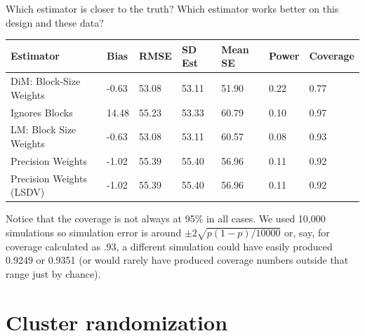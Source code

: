 \documentclass[
  ignorenonframetext,
]{beamer}
\begin{document}
\begin{frame}{Which estimator is closer to the truth?}
\protect\hypertarget{which-estimator-is-closer-to-the-truth-1}{}
Which estimator works better on this design and these data?

\scriptsize
\begin{tabular}{l|l|l|l|l|l|l}
\hline
Estimator & Bias & RMSE & SD Est & Mean SE & Power & Coverage\\
\hline
DiM: Block-Size Weights & -0.63 & 53.08 & 53.11 & 51.90 & 0.22 & 0.77\\
\hline
Ignores Blocks & 14.48 & 55.23 & 53.33 & 60.79 & 0.10 & 0.97\\
\hline
LM: Block Size Weights & -0.63 & 53.08 & 53.11 & 60.57 & 0.08 & 0.93\\
\hline
Precision Weights & -1.02 & 55.39 & 55.40 & 56.96 & 0.11 & 0.92\\
\hline
Precision Weights (LSDV) & -1.02 & 55.39 & 55.40 & 56.96 & 0.11 & 0.92\\
\hline
\end{tabular}

\normalsize

Notice that the coverage is not always at 95\% in all cases. We used
10,000 simulations so simulation error is around
\(\pm 2 \sqrt{p(1-p)/10000}\) or, say, for coverage calculated as .93, a
different simulation could have easily produced 0.9249 or 0.9351 (or
would rarely have produced coverage numbers outside that range just by
chance).
\end{frame}

\hypertarget{cluster-randomization}{%
\section{Cluster randomization}\label{cluster-randomization}}
\end{document}

